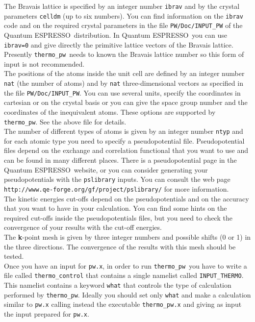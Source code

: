 \documentclass[12pt,a4paper]{article}
\def\qe{{\sc Quantum ESPRESSO}}
\def\thermo{\texttt{thermo\_pw}}
\begin{document}
The Bravais lattice is specified by an integer number \texttt{ibrav} and by the
crystal parameters \texttt{celldm} (up to six numbers). You can find 
information on the \texttt{ibrav} code and on the required crystal parameters
in the file \texttt{PW/Doc/INPUT\_PW} of the \qe\ distribution. 
In \qe\ you can use \texttt{ibrav=0} and give directly the primitive
lattice vectors of the Bravais lattice. Presently \thermo\ needs to
known the Bravais lattice number so this form of input is not recommended. \\

The positions of the atoms inside the unit cell are defined by an integer
number \texttt{nat} (the number of atoms) and by \texttt{nat} 
three-dimensional vectors as specified in the file \texttt{PW/Doc/INPUT\_PW}.
You can use several units, specify the coordinates in cartesian or on the
crystal basis or you can give the space group number and the
coordinates of the inequivalent atoms. 
These options are supported by \thermo. See the above file for details. \\

The number of different types of atoms is given by an integer number 
\texttt{ntyp} and for each atomic type you need to specify a 
pseudopotential file. Pseudopotential files depend on the exchange and 
correlation functional that you want to use and can be found in many 
different places. There is a pseudopotential page in the \qe\ website, or 
you can consider generating your pseudopotentials with the \texttt{pslibrary} 
inputs. You can consult the web page \texttt{http://www.qe-forge.org/gf/project/pslibrary/} for more information. \\

The kinetic energies cut-offs depend on the pseudopotentials
and on the accuracy that you want to have in your calculation. You can 
find some hints on the required cut-offs inside the pseudopotentials files,
but you need to check the convergence of your results with the cut-off 
energies. \\

The {\bf k}-point mesh is given by three integer numbers and possible
shifts (0 or 1) in the three directions. The convergence of the results
with this mesh should be tested. \\

Once you have an input for \texttt{pw.x}, in order to run \thermo\ you
have to write a file called \texttt{thermo\_control} that contains a single
namelist called \texttt{INPUT\_THERMO}. This namelist contains a keyword
\texttt{what} that controls the type of calculation performed by 
\thermo. Ideally you should set only \texttt{what} and make a calculation
similar to \texttt{pw.x} calling instead the executable \texttt{thermo\_pw.x}
and giving as input the input prepared for \texttt{pw.x}.
\end{document}
